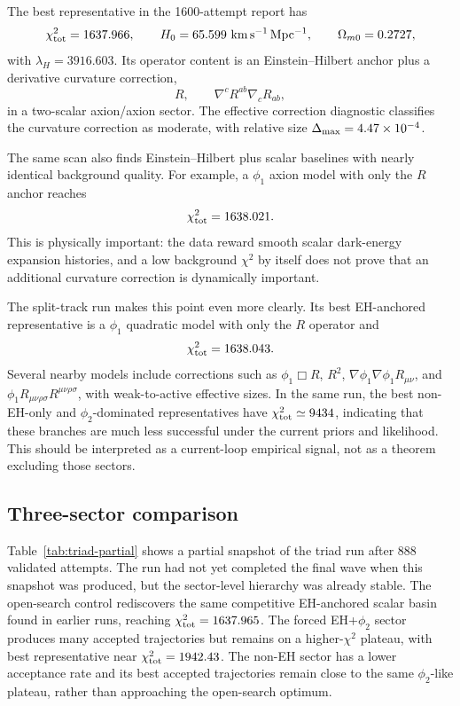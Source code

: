 \documentclass[aps,prd,twocolumn,superscriptaddress,nofootinbib,longbibliography]{revtex4-2}
\newcommand{\chiT}{\chi^2_{\rm tot}}
\begin{document}
The best representative in the 1600-attempt report has
\begin{equation}
\chiT=1637.966,
\qquad
H_0=65.599~{\rm km\,s^{-1}\,Mpc^{-1}},
\qquad
\Omega_{m0}=0.2727,
\end{equation}
with $\lambda_H=3916.603$.  Its operator content is an Einstein--Hilbert anchor plus a derivative curvature correction,
\begin{equation}
R,\qquad \nabla^cR^{ab}\nabla_cR_{ab},
\end{equation}
in a two-scalar axion/axion sector.  The effective correction diagnostic classifies the curvature correction as moderate, with relative size $\Delta_{\rm max}=4.47\times10^{-4}$.

The same scan also finds Einstein--Hilbert plus scalar baselines with nearly identical background quality.  For example, a $\phi_1$ axion model with only the $R$ anchor reaches
\begin{equation}
\chiT=1638.021.
\end{equation}
This is physically important: the data reward smooth scalar dark-energy expansion histories, and a low background $\chi^2$ by itself does not prove that an additional curvature correction is dynamically important.

The split-track run makes this point even more clearly.  Its best EH-anchored representative is a $\phi_1$ quadratic model with only the $R$ operator and
\begin{equation}
\chiT=1638.043.
\end{equation}
Several nearby models include corrections such as $\phi_1\Box R$, $R^2$, $\nabla\phi_1\nabla\phi_1R_{\mu\nu}$, and $\phi_1R_{\mu\nu\rho\sigma}R^{\mu\nu\rho\sigma}$, with weak-to-active effective sizes.  In the same run, the best non-EH-only and $\phi_2$-dominated representatives have $\chiT\simeq9434$, indicating that these branches are much less successful under the current priors and likelihood.  This should be interpreted as a current-loop empirical signal, not as a theorem excluding those sectors.

\subsection{Three-sector comparison}
\label{subsec:three-sector-results}

Table~\ref{tab:triad-partial} shows a partial snapshot of the triad run after 888 validated attempts.  The run had not yet completed the final wave when this snapshot was produced, but the sector-level hierarchy was already stable.  The open-search control rediscovers the same competitive EH-anchored scalar basin found in earlier runs, reaching $\chiT=1637.965$.  The forced EH+$\phi_2$ sector produces many accepted trajectories but remains on a higher-$\chi^2$ plateau, with best representative near $\chiT=1942.43$.  The non-EH sector has a lower acceptance rate and its best accepted trajectories remain close to the same $\phi_2$-like plateau, rather than approaching the open-search optimum.
\end{document}
